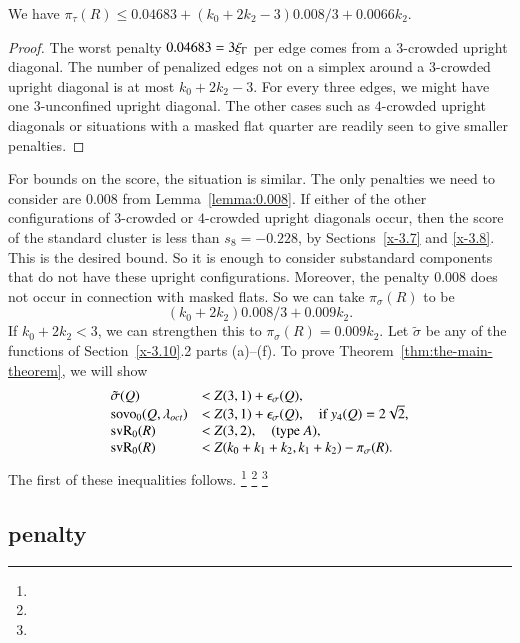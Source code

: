 \begin{lemma}
We have
    $\pi_\tau(R)\le 0.04683 + (k_0+2k_2-3)0.008/3 +0.0066k_2$.
\end{lemma}

\begin{proof}
The worst penalty $0.04683=3\xi_\Gamma$ per edge comes from a
$3$-crowded upright diagonal. The number of penalized edges not on
a simplex around a $3$-crowded upright diagonal is at most
$k_0+2k_2-3$. For every three edges, we might have one
$3$-unconfined upright diagonal. The other cases such as
$4$-crowded upright diagonals or situations with a masked flat
quarter are readily seen to give smaller penalties.
\end{proof}

For bounds on the score, the situation is similar.  The only
penalties we need to consider are $0.008$ from
Lemma~\ref{lemma:0.008}. If either of the other configurations of
$3$-crowded or $4$-crowded upright diagonals occur, then the score
of the standard cluster is less than $s_8=-0.228$, by
Sections~\ref{x-3.7} and \ref{x-3.8}. This is the desired bound.
So it is enough to consider substandard components that do not have these
upright configurations. Moreover, the penalty $0.008$ does not
occur in connection with masked flats. So we can take
$\pi_\sigma(R)$ to be
    $$(k_0+2k_2)0.008/3 + 0.009 k_2.$$
If $k_0+2k_2<3$, we can strengthen this to
    $\pi_\sigma(R)=0.009 k_2$.
Let $\tilde\sigma$ be any of the functions of Section~\ref{x-3.10}.2
parts (a)--(f). To prove Theorem~\ref{thm:the-main-theorem}, we will
show
    \begin{equation}
    \begin{array}{lll}
    \tilde\sigma(Q)&< Z(3,1)+\epsilon_\sigma(Q),\\
    {\operatorname{sovo}}_0(Q,\lambda_{oct})
    &< Z(3,1)+\epsilon_\sigma(Q),\quad\text{if }y_4(Q)=2\sqrt2,\\
    {\operatorname{svR}}_0(R)&< Z(3,2),\quad\text{(type $A$)},\\
    {\operatorname{svR}}_0(R) &< Z(k_0+k_1+k_2,k_1+k_2) - \pi_\sigma(R).
    \label{eqn:sigma<Z(n,k)}
    \end{array}
    \end{equation}
The first of these inequalities follows.%
\footnote{} %
\footnote{} %
\footnote{} %


\subsection{penalty} %
\label{sec:4.2} \label{sec:penalty}

